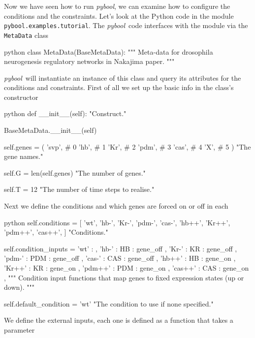 \documentclass{article}
\newcommand{\pybool}{\emph{pybool}}
\begin{document}
Now we have seen how to run \pybool, we can examine how to configure the conditions and the constraints. Let's look at the Python code in the module \verb!pybool.examples.tutorial!. The \pybool\ code interfaces with the module via the \verb!MetaData! class
\begin{pygmented}{python}
class MetaData(BaseMetaData):
    """
    Meta-data for drosophila neurogenesis regulatory 
    networks in Nakajima paper.
    """
\end{pygmented}
\pybool\ will instantiate an instance of this class and query its attributes for the conditions and constraints. First of all we set up the basic info in the class's constructor
\begin{pygmented}{python}
    def __init__(self):
        "Construct."
        
        BaseMetaData.__init__(self)

        self.genes = (
            'svp',  # 0
            'hb',   # 1
            'Kr',   # 2
            'pdm',  # 3
            'cas',  # 4
            'X',    # 5
        )
        "The gene names."

        self.G = len(self.genes)
        "The number of genes."

        self.T = 12
        "The number of time steps to realise."
\end{pygmented}
Next we define the conditions and which genes are forced on or off in each
\begin{pygmented}{python}
        self.conditions = [
            'wt',
            'hb-',
            'Kr-',
            'pdm-',
            'cas-',
            'hb++',
            'Kr++',
            'pdm++',
            'cas++',
        ]
        "Conditions."

        self.condition_inputs = {
            'wt'    : { },
            'hb-'   : {  HB : gene_off },
            'Kr-'   : {  KR : gene_off },
            'pdm-'  : { PDM : gene_off },
            'cas-'  : { CAS : gene_off },
            'hb++'  : {  HB : gene_on },
            'Kr++'  : {  KR : gene_on },
            'pdm++' : { PDM : gene_on },
            'cas++' : { CAS : gene_on },
        }
        """
        Condition input functions that map genes 
        to fixed expression states (up or down).
        """

        self.default_condition = 'wt'
        "The condition to use if none specified."
\end{pygmented}
We define the external inputs, each one is defined as a function that takes a parameter
\end{document}
